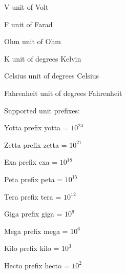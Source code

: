 \begin{datadesc}{V}
unit of Volt
\end{datadesc}

\begin{datadesc}{F}
unit of Farad
\end{datadesc}

\begin{datadesc}{Ohm}
unit of Ohm
\end{datadesc}

\begin{datadesc}{K}
unit of degrees Kelvin
\end{datadesc}

\begin{datadesc}{Celsius}
unit of degrees Celsius
\end{datadesc}

\begin{datadesc}{Fahrenheit}
unit of degrees Fahrenheit
\end{datadesc}

\noindent Supported unit prefixes:

\begin{datadesc}{Yotta}
prefix yotta = $10^{24}$
\end{datadesc}

\begin{datadesc}{Zetta}
prefix zetta = $10^{21}$
\end{datadesc}

\begin{datadesc}{Exa}
prefix exa = $10^{18}$
\end{datadesc}

\begin{datadesc}{Peta}
prefix peta = $10^{15}$
\end{datadesc}

\begin{datadesc}{Tera}
prefix tera = $10^{12}$
\end{datadesc}

\begin{datadesc}{Giga}
prefix giga = $10^9$
\end{datadesc}

\begin{datadesc}{Mega}
prefix mega = $10^6$
\end{datadesc}

\begin{datadesc}{Kilo}
prefix kilo = $10^3$
\end{datadesc}

\begin{datadesc}{Hecto}
prefix hecto = $10^2$
\end{datadesc}


